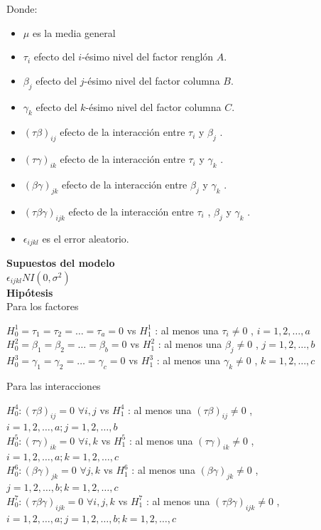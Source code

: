 Donde:
\begin{itemize}
	\item $\mu$ es la media general
	\item $\tau_{i}$ efecto del $i$-ésimo nivel del factor renglón $A$.
	\item $\beta_{j}$ efecto del $j$-ésimo nivel del factor columna $B$.
	\item $\gamma_{k} $ efecto del $k$-ésimo nivel del factor columna $C$.
	\item $(\tau \beta)_{ij} $ efecto de la interacción entre $\tau_{i}$  y  $\beta_{j}$ .
	\item $(\tau \gamma)_{ik}$ efecto de la interacción entre  $\tau_{i}$  y  $\gamma_{k}$ .
	\item $(\beta \gamma)_{jk}$ efecto de la interacción entre $\beta_{j}$ y  $\gamma_{k}$ .
	\item $(\tau \beta \gamma)_{ijk}$ efecto de la interacción entre $\tau_{i}$  , $\beta_{j}$ y $\gamma_{k}$ .
	\item $\epsilon_{ijkl}$ es el error aleatorio.
\end{itemize}


\textbf{Supuestos del modelo}\\
 $\epsilon_{ijkl} NI (0, \sigma^{2})$\\

\textbf{Hipótesis}\\
Para los factores
\begin{center}
	$H^{1}_{0} =\tau_{1} = \tau_{2} = \dots = \tau_{a} = 0$ vs $H^{1}_{1}$ : al menos una $\tau_{i} \neq 0$ , $i = 1,2, \dots, a$ \\
	$H^{2}_{0} =\beta_{1} = \beta_{2} = \dots = \beta_{b} = 0 $ vs $H^{2}_{1}$ : al menos una $\beta_{j} \neq 0$ , $j = 1,2, \dots,b$ \\
	$H^{3}_{0} =\gamma_{1} = \gamma_{2} = \dots = \gamma_{c} = 0 $ vs $H^{3}_{1}$ : al menos una $\gamma_{k} \neq 0$ , $k = 1,2, \dots,c$ \\
\end{center}

Para las interacciones 
\begin{center}
	$H^{4}_{0} : (\tau \beta)_{ij} = 0$ $ \forall i,j$ vs $H^{4}_{1}$ : al menos una $(\tau \beta)_{ij} \neq 0$ , $i = 1,2, \dots, a; j = 1,2, \dots,b$ \\
	$H^{5}_{0} : (\tau \gamma)_{ik} = 0$ $ \forall i,k$ vs $H^{5}_{1}$ : al menos una $(\tau \gamma)_{ik} \neq 0$ , $i = 1,2, \dots, a; k = 1,2, \dots,c$ \\
	$H^{6}_{0} : (\beta \gamma)_{jk} = 0$ $ \forall j,k$ vs $H^{6}_{1}$ : al menos una $(\beta \gamma)_{jk} \neq 0$ , $j = 1,2, \dots, b; k = 1,2, \dots, c$ \\
	$H^{7}_{0} : (\tau \beta \gamma)_{ijk} = 0$ $ \forall i,j,k$ vs $H^{7}_{1}$ : al menos una $(\tau \beta \gamma)_{ijk} \neq 0$ , $i = 1,2, \dots, a; j = 1,2, \dots, b; k = 1,2, \dots, c$ \\
\end{center}

